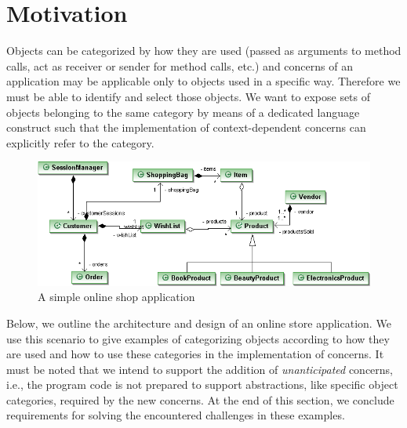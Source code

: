 \section{Motivation}
\label{sect:motivation}

Objects can be categorized by how they are used (passed as arguments to method calls, act as receiver or sender for method calls, etc.) and concerns of an application may be applicable only to objects used in a specific way.
Therefore we must be able to identify and select those objects.
We want to expose sets of objects belonging to the same category by means of a dedicated language construct such that the implementation of context-dependent concerns can explicitly refer to the category.

\begin{figure}
\includegraphics[width=\textwidth]{images/myonlineshop.png}%
\caption{A simple online shop application}%
\label{fig:shop}%
\end{figure}

Below, we outline the architecture and design of an online store application. We use this scenario to give examples of categorizing objects according to how they are used and how to use these categories in the implementation of concerns. It must be noted that we intend to support the addition of \emph{unanticipated} concerns, i.e., the program code is not prepared to support abstractions, like specific object categories, required by the new concerns.
At the end of this section, we conclude requirements for solving the encountered challenges in these examples.

